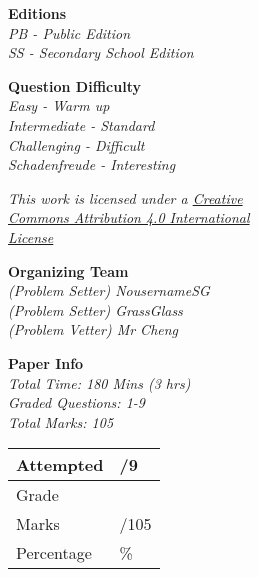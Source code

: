 \begin{multicols*}{2}
  \textbf{\Large{Editions}} \\
  \textit{
      \hspace*{13.5pt} PB - Public Edition \\
      \hspace*{13.5pt} SS - Secondary School Edition \\
}

  \textbf{\Large{Question Difficulty}} \\
  \textit{
        \hspace*{13.5pt} Easy - Warm up \\
        \hspace*{13.5pt} Intermediate - Standard \\
        \hspace*{13.5pt} Challenging - Difficult \\
        \hspace*{13.5pt} Schadenfreude - Interesting
}

\vspace*{65pt}

\textit{This work is licensed under a \href{http://creativecommons.org/licenses/by/4.0/}{Creative \\ \hspace*{13.5pt} Commons Attribution 4.0 International \\ \hspace*{13.5pt} License}}

\textbf{\Large{Organizing Team}} \\
\textit{
    \hspace*{13pt} (Problem Setter) NousernameSG \\
    \hspace*{13pt} (Problem Setter) GrassGlass \\
    \hspace*{13pt} (Problem Vetter) Mr Cheng \\
}

\textbf{\Large{Paper Info}} \\
\textit{
    \hspace*{13pt} Total Time: 180 Mins (3 hrs) \\
    \hspace*{13pt} Graded Questions: 1-9 \\
    \hspace*{13pt} Total Marks: 105
}
    \vspace*{15pt}

    \begin{tabularx}{0.37\textwidth} {
      | >{\centering\arraybackslash}X
      | >{\centering\arraybackslash}X | }
      \hline
      Attempted & \phantom{9}/9 \\
      \hline
      Grade & \\
      \hline
      Marks & \phantom{105}/105 \\
      \hline
      Percentage & \phantom{100}\% \\
      \hline
  \end{tabularx}
\end{multicols*}

